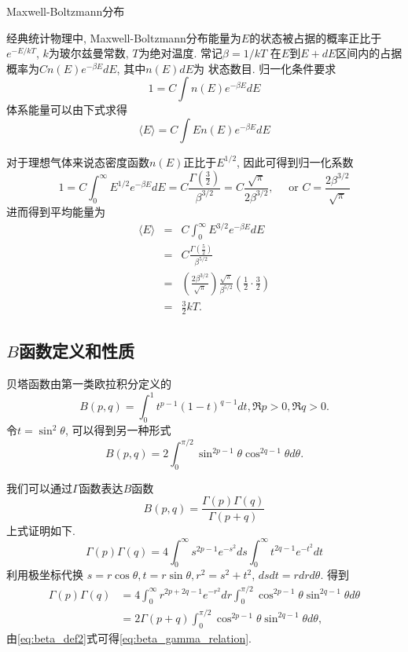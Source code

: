 \begin{example}
Maxwell-Boltzmann分布
\end{example}
\begin{solution}
    经典统计物理中, Maxwell-Boltzmann分布能量为$E$的状态被占据的概率正比于
    $e^{-E/kT}$, $k$为玻尔兹曼常数, $T$为绝对温度. 常记$\beta=1 / k T$
    在$E$到$E+dE$区间内的占据概率为$C n(E) e^{-\beta E} dE$, 其中$n(E)dE$为
    状态数目. 归一化条件要求
    $$
    1=C \int n(E) e^{-\beta E} d E
    $$
    体系能量可以由下式求得
    $$
    \langle E\rangle=C \int E n(E) e^{-\beta E} d E
    $$


    对于理想气体来说态密度函数$n(E)$正比于$E^{1/2}$, 因此可得到归一化系数
    $$
    1=C \int_0^{\infty} E^{1 / 2} e^{-\beta E} d E=C \frac{\Gamma\left(\frac{3}{2}\right)}{\beta^{3 / 2}}=C \frac{\sqrt{\pi}}{2 \beta^{3 / 2}}, \quad \text { or } C=\frac{2 \beta^{3 / 2}}{\sqrt{\pi}}
    $$
    进而得到平均能量为
    \begin{eqnarray*}
        \langle E\rangle
        &=&C \int_{0}^{\infty} E^{3 / 2} e^{-\beta E} d E 
        \\
        &=&C \frac{\Gamma\left(\frac{5}{2}\right)}{\beta^{5 / 2}}
        \\
        &=&\left(\frac{2 \beta^{3 / 2}}{\sqrt{\pi}}\right) 
        \frac{\sqrt{\pi}}{\beta^{5 / 2}}\left(\frac{1}{2} \cdot \frac{3}{2}\right)
        \\
        &=&\frac{3}{2} k T.
    \end{eqnarray*}
\end{solution}

\subsection{\texorpdfstring{$B$}{B}函数定义和性质}
贝塔函数由第一类欧拉积分定义的
\begin{equation}
    B(p, q) = \int_0^1 t^{p -1} (1-t)^{q-1} dt, \Re p> 0, \Re q >0.
    \label{eq:beta_def1}
\end{equation}
令$t=\sin^2{\theta}$, 可以得到另一种形式
\begin{equation}
    B(p, q)  = 2\int_{0}^{\pi/2} \sin ^{2p -1}{\theta} \cos^{2q -1}{\theta} d\theta.
    \label{eq:beta_def2}
\end{equation}

我们可以通过$\Gamma$函数表达$B$函数
\begin{equation}
B(p, q)=\frac{\Gamma(p) \Gamma(q)}{\Gamma(p+q)}
\label{eq:beta_gamma_relation}
\end{equation}
上式证明如下.
$$
\Gamma(p) \Gamma(q)=4 \int_{0}^{\infty} s^{2 p-1} e^{-s^{2}} d s \int_{0}^{\infty} t^{2 q-1} e^{-t^{2}} d t
$$
利用极坐标代换
 $s=r \cos \theta, t=r \sin \theta, r^{2}=s^{2}+t^{2}$,  $d s d t=r d r d \theta$.
 得到
 $$
 \begin{aligned}
 \Gamma(p) \Gamma(q) & =4 \int_{0}^{\infty} r^{2 p+2 q-1} e^{-r^{2}} d r \int_{0}^{\pi / 2} \cos ^{2 p-1} \theta \sin ^{2 q-1} \theta d \theta \\
 & =2 \Gamma(p+q) \int_{0}^{\pi / 2} \cos ^{2 p-1} \theta \sin ^{2 q-1} \theta d \theta,
 \end{aligned}
 $$
 由\eqref{eq:beta_def2}式可得\eqref{eq:beta_gamma_relation}.

